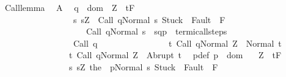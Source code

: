 \begin{isabellebody}
\isamarkupfalse%
\ Call{\isacharunderscore}lemma{\isacharcolon}\isanewline
\ \ A{\isacharcolon}\ \isanewline
\ {\isachardoublequoteopen}{\isasymforall}q\ {\isasymin}\ dom\ {\isasymGamma}{\isachardot}\ {\isasymforall}Z{\isachardot}\ {\isasymGamma}{\isacharcomma}{\isasymTheta}\ {\isasymturnstile}\isactrlsub t\isactrlbsub {\isacharslash}F\isactrlesub \ \isanewline
\ \ \ \ \ \ \ \ \ \ \ \ \ \ \ \ \ {\isacharbraceleft}s{\isachardot}\ s{\isacharequal}Z\ {\isasymand}\ {\isasymGamma}{\isasymturnstile}{\isasymlangle}Call\ q{\isacharcomma}Normal\ s{\isasymrangle}\ {\isasymRightarrow}{\isasymnotin}{\isacharparenleft}{\isacharbraceleft}Stuck{\isacharbraceright}\ {\isasymunion}\ Fault\ {\isacharbackquote}\ {\isacharparenleft}{\isacharminus}F{\isacharparenright}{\isacharparenright}\ {\isasymand}\ \isanewline
\ \ \ \ \ \ \ \ \ \ \ \ \ \ \ \ \ \ \ \ {\isasymGamma}{\isasymturnstile}Call\ q{\isasymdown}Normal\ s\ {\isasymand}\ {\isacharparenleft}{\isacharparenleft}s{\isacharcomma}q{\isacharparenright}{\isacharcomma}{\isacharparenleft}{\isasymsigma}{\isacharcomma}p{\isacharparenright}{\isacharparenright}\ {\isasymin}\ termi{\isacharunderscore}call{\isacharunderscore}steps\ {\isasymGamma}{\isacharbraceright}\isanewline
\ \ \ \ \ \ \ \ \ \ \ \ \ \ \ \ \ {\isacharparenleft}Call\ q{\isacharparenright}\isanewline
\ \ \ \ \ \ \ \ \ \ \ \ \ \ \ \ {\isacharbraceleft}t{\isachardot}\ {\isasymGamma}{\isasymturnstile}{\isasymlangle}Call\ q{\isacharcomma}Normal\ Z{\isasymrangle}\ {\isasymRightarrow}\ Normal\ t{\isacharbraceright}{\isacharcomma}\isanewline
\ \ \ \ \ \ \ \ \ \ \ \ \ \ \ \ {\isacharbraceleft}t{\isachardot}\ {\isasymGamma}{\isasymturnstile}{\isasymlangle}Call\ q{\isacharcomma}Normal\ Z{\isasymrangle}\ {\isasymRightarrow}\ Abrupt\ t{\isacharbraceright}{\isachardoublequoteclose}\isanewline
\ \ pdef{\isacharcolon}\ {\isachardoublequoteopen}p\ {\isasymin}\ dom\ {\isasymGamma}{\isachardoublequoteclose}\isanewline
\ \ {\isachardoublequoteopen}{\isasymAnd}Z{\isachardot}\ {\isasymGamma}{\isacharcomma}{\isasymTheta}\ {\isasymturnstile}\isactrlsub t\isactrlbsub {\isacharslash}F\isactrlesub \ \ \isanewline
\ \ \ \ \ \ \ \ \ \ \ \ \ \ {\isacharparenleft}{\isacharbraceleft}{\isasymsigma}{\isacharbraceright}\ {\isasyminter}\ {\isacharbraceleft}s{\isachardot}\ s{\isacharequal}Z\ {\isasymand}{\isasymGamma}{\isasymturnstile}{\isasymlangle}the\ {\isacharparenleft}{\isasymGamma}\ p{\isacharparenright}{\isacharcomma}Normal\ s{\isasymrangle}\ {\isasymRightarrow}{\isasymnotin}{\isacharparenleft}{\isacharbraceleft}Stuck{\isacharbraceright}\ {\isasymunion}\ Fault\ {\isacharbackquote}\ {\isacharparenleft}{\isacharminus}F{\isacharparenright}{\isacharparenright}\ {\isasymand}\ \ \isanewline

\end{isabellebody}
